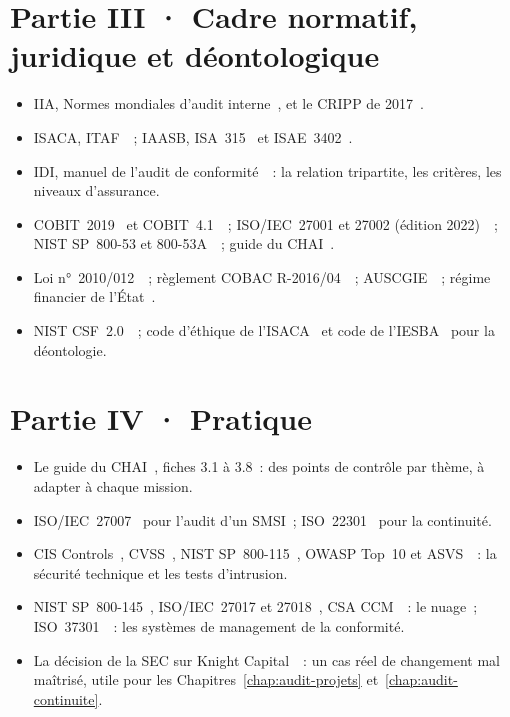 \section*{Partie III · Cadre normatif, juridique et déontologique}

\begin{itemize}
    \item IIA, Normes mondiales d'audit interne~\cite{iia2024gias}, et le
          CRIPP de 2017~\cite{iia2017cripp}.
    \item ISACA, ITAF~\cite{isaca2020itaf}~; IAASB, ISA~315~\cite{iaasb2019isa315}
          et ISAE~3402~\cite{iaasb2011isae3402}.
    \item IDI, manuel de l'audit de conformité~\cite{idi2021conformite}~:
          la relation tripartite, les critères, les niveaux d'assurance.
    \item COBIT~2019~\cite{isaca2018cobitintro,isaca2018cobitobjectifs} et
          COBIT~4.1~\cite{itgi2007cobit41}~; ISO/IEC~27001 et 27002 (édition
          2022)~\cite{iso27001_2022,iso27002_2022}~; NIST SP~800-53 et
          800-53A~\cite{nist2020sp80053,nist2022sp80053a}~; guide du
          CHAI~\cite{chai2014guide}.
    \item Loi n°~2010/012~\cite{loi2010012}~; règlement COBAC
          R-2016/04~\cite{cobac2016r04}~; AUSCGIE~\cite{ohada2014auscgie}~;
          régime financier de l'État~\cite{minfi2023regimefinancier}.
    \item NIST CSF~2.0~\cite{nist2024csf}~; code d'éthique de
          l'ISACA~\cite{isaca2024ethique} et code de l'IESBA~\cite{iesba2018code}
          pour la déontologie.
\end{itemize}

\section*{Partie IV · Pratique}

\begin{itemize}
    \item Le guide du CHAI~\cite{chai2014guide}, fiches 3.1 à 3.8~: des
          points de contrôle par thème, à adapter à chaque mission.
    \item ISO/IEC~27007~\cite{iso27007_2020} pour l'audit d'un SMSI~;
          ISO~22301~\cite{iso22301_2019} pour la continuité.
    \item CIS Controls~\cite{cis2021controls}, CVSS~\cite{first2019cvss},
          NIST SP~800-115~\cite{nist2008sp800115}, OWASP Top~10 et
          ASVS~\cite{owasp2021top10,owasp2021asvs}~: la sécurité technique et
          les tests d'intrusion.
    \item NIST SP~800-145~\cite{nist2011sp800145}, ISO/IEC~27017 et
          27018~\cite{iso27017_2015,iso27018_2019}, CSA
          CCM~\cite{csa2021ccm}~: le nuage~; ISO~37301~\cite{iso37301_2021}~:
          les systèmes de management de la conformité.
    \item La décision de la SEC sur Knight Capital~\cite{sec2013knight}~: un
          cas réel de changement mal maîtrisé, utile pour les
          Chapitres~\ref{chap:audit-projets} et~\ref{chap:audit-continuite}.
\end{itemize}

